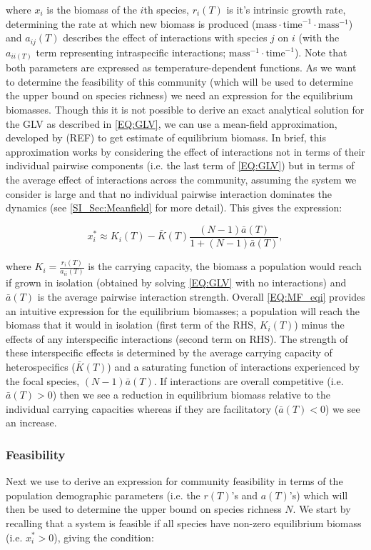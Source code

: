 \documentclass{article}
\begin{document}
where $x_i$ is the biomass of the $i$th species, $r_i(T)$ is it's intrinsic growth rate, determining the rate at which new biomass is produced ($\text{mass} \cdot \text{time}^{-1} \cdot \text{mass}^{-1} $) and $a_{ij}(T)$ describes the effect of interactions with species $j$ on $i$ (with the $a_{ii(T)}$ term representing intraspecific interactions; $\text{mass}^{-1} \cdot \text{time}^{-1}$). Note that both parameters are expressed as temperature-dependent functions. As we want to determine the feasibility of this community (which will be used to determine the upper bound on species richness) we need an expression for the equilibrium biomasses. Though this it is not possible to derive an exact analytical solution for the GLV as described in \cref{EQ:GLV}, we can use a mean-field approximation, developed by (REF) to get estimate of equilibrium biomass. In brief, this approximation works by considering the effect of interactions not in terms of their individual pairwise components (i.e. the last term of \cref{EQ:GLV}) but in terms of the average effect of interactions across the community, assuming the system we consider is large and that no individual pairwise interaction dominates the dynamics (see \cref{SI_Sec:Meanfield} for more detail). This gives the expression: 

\begin{equation}\label{EQ:MF_eqi}
  x^*_i \approx K_i(T) -  \bar{K}(T)  \frac{ (N-1)\bar{a}(T)}{1 + (N-1)\bar{a}(T)}, 
\end{equation}

where $K_i = \frac{r_i(T)}{a_{ii}(T)}$ is the carrying capacity, the biomass a population would reach if grown in isolation (obtained by solving \cref{EQ:GLV} with no interactions) and $\bar{a}(T)$ is the average pairwise interaction strength. Overall \cref{EQ:MF_eqi} provides an intuitive expression for the equilibrium biomasses; a population will reach the biomass that it would in isolation (first term of the RHS, $K_i(T)$) minus the effects of any interspecific interactions (second term on RHS). The strength of these interspecific effects is determined by the average carrying capacity of heterospecifics ($\bar{K}(T)$) and a saturating function of interactions experienced by the focal species, $(N-1)\bar{a}(T)$. If interactions are overall competitive (i.e. $ \bar{a}(T) > 0$) then we see a reduction in equilibrium biomass relative to the individual carrying capacities whereas if they are facilitatory ($ \bar{a}(T) < 0$) we see an increase.  

\subsubsection{Feasibility}
Next we use  to derive an expression for community feasibility in terms of the population demographic parameters (i.e. the $r(T)$'s and $a(T)$'s) which will then be used to determine the upper bound on species richness $N$. We start by recalling that a system is feasible if all species have non-zero equilibrium biomass (i.e. $x_i^* > 0 $), giving the condition:
\end{document}

